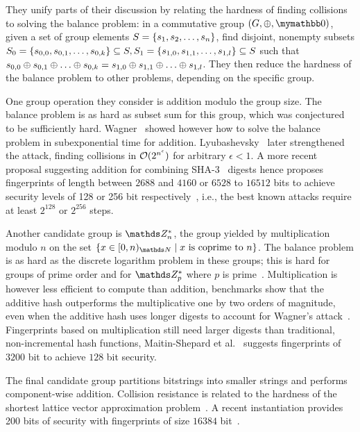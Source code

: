 \documentclass[conference]{IEEEtran}
\begin{document}
They unify parts of their discussion by relating the hardness of finding collisions to solving the balance problem: in a commutative group $(G, \groupaddsym, \neutraladd)$, given a set of group elements $S = \{s_1, s_2, \ldots, s_n\}$, find disjoint, nonempty subsets $S_0 = \{s_{0, 0}, s_{0, 1}, \ldots, s_{0, k}\} \subseteq S, S_1 = \{s_{1, 0}, s_{1, 1}, \ldots, s_{1, l}\} \subseteq S$ such that $s_{0, 0} \oplus s_{0, 1}  \oplus \ldots  \oplus s_{0, k} = s_{1, 0}  \oplus s_{1, 1}  \oplus \ldots  \oplus s_{1, l}$. They then reduce the hardness of the balance problem to other problems, depending on the specific group.

One group operation they consider is addition modulo the group size. The balance problem is as hard as subset sum for this group, which was conjectured to be sufficiently hard. Wagner~\cite{wagner2002generalized} showed however how to solve the balance problem in subexponential time for addition. Lyubashevsky~\cite{lyubashevsky2005parity} later strengthened the attack, finding collisions in $\mathcal{O}(2^{n^\epsilon})$ for arbitrary $\epsilon < 1$. A more recent proposal suggesting addition for combining SHA-3~\cite{dworkin2015sha} digests hence proposes fingerprints of length between $2688$ and $4160$ or $6528$ to $16512$ bits to achieve security levels of 128 or 256 bit respectively~\cite{mihajloska2015reviving}, i.e., the best known attacks require at least $2^{128}$ or $2^{256}$ steps.

Another candidate group is $\Z_n^\ast$, the group yielded by multiplication modulo $n$ on the set $\set{x \in \range{0}{n}{\N} \mid \text{$x$ is coprime to $n$}}$. The balance problem is as hard as the discrete logarithm problem in these groups; this is hard for groups of prime order and for $\Z_p^\ast$ where $p$ is prime~\cite{bellare1997new}. Multiplication is however less efficient to compute than addition, benchmarks show that the additive hash outperforms the multiplicative one by two orders of magnitude, even when the additive hash uses longer digests to account for Wagner's attack~\cite{stanton2010fastad}. Fingerprints based on multiplication still need larger digests than traditional, non-incremental hash functions, Maitin-Shepard et al.~\cite{maitin2017elliptic} suggests fingerprints of $3200$ bit to achieve $128$ bit security.

The final candidate group partitions bitstrings into smaller strings and performs component-wise addition. Collision resistance is related to the hardness of the shortest lattice vector approximation problem~\cite{ajtai1996generating}. A recent instantiation provides 200 bits of security with fingerprints of size $16384$ bit~\cite{lewi2019securing}.
\end{document}
